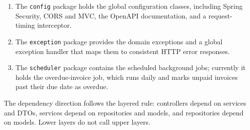 \begin{enumerate}[label=(\roman*)]
  \item The \texttt{config} package holds the global configuration classes,
  including Spring Security, CORS and MVC, the OpenAPI documentation, and a
  request-timing interceptor.

  \item The \texttt{exception} package provides the domain exceptions and a
  global exception handler that maps them to consistent HTTP error responses.

  \item The \texttt{scheduler} package contains the scheduled background jobs;
  currently it holds the overdue-invoice job, which runs daily and marks unpaid
  invoices past their due date as overdue.
\end{enumerate}
The dependency direction follows the layered rule: controllers depend on
services and DTOs, services depend on repositories and models, and repositories
depend on models. Lower layers do not call upper layers.

